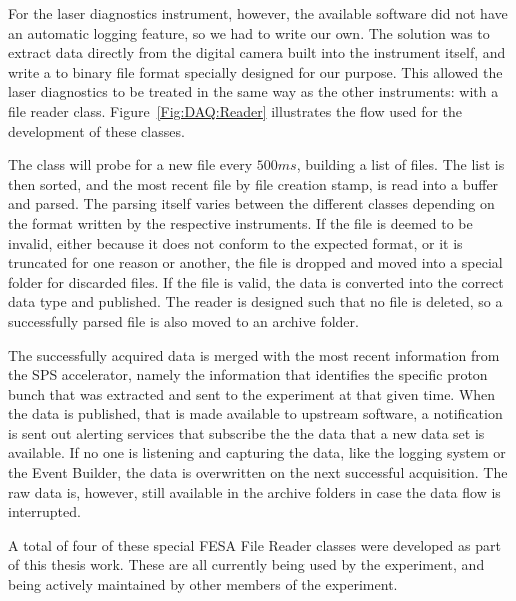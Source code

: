 For the laser diagnostics instrument, however, the available software did not have an automatic logging feature, so we had to write our own.
The solution was to extract data directly from the digital camera built into the instrument itself, and write a to binary file format specially designed for our purpose.
This allowed the laser diagnostics to be treated in the same way as the other instruments: with a file reader class.
Figure~\ref{Fig:DAQ:Reader} illustrates the flow used for the development of these classes.

The class will probe for a new file every $500\unit{ms}$, building a list of files.
The list is then sorted, and the most recent file by file creation stamp, is read into a buffer and parsed.
The parsing itself varies between the different classes depending on the format written by the respective instruments.
If the file is deemed to be invalid, either because it does not conform to the expected format, or it is truncated for one reason or another, the file is dropped and moved into a special folder for discarded files.
If the file is valid, the data is converted into the correct data type and published.
The reader is designed such that no file is deleted, so a successfully parsed file is also moved to an archive folder.

The successfully acquired data is merged with the most recent information from the SPS accelerator, namely the information that identifies the specific proton bunch that was extracted and sent to the experiment at that given time.
When the data is published, that is made available to upstream software, a notification is sent out alerting services that subscribe the the data that a new data set is available.
If no one is listening and capturing the data, like the logging system or the Event Builder, the data is overwritten on the next successful acquisition.
The raw data is, however, still available in the archive folders in case the data flow is interrupted.

A total of four of these special FESA File Reader classes were developed as part of this thesis work.
These are all currently being used by the experiment, and being actively maintained by other members of the experiment.

